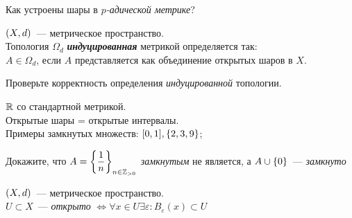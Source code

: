 \documentclass{article}
\begin{document}
    \begin{task_boxed}
        Как устроены шары в \textit{$p$-адической метрике}?
    \end{task_boxed}

    \begin{definition_boxed}
        $\lr*{X, d}$~--- метрическое пространство.\\
        Топология $\Omega_d$ \textbf{\textit{индуцированная}} метрикой определяется так:\\
        $A \in \Omega_d$, если $A$ представляется как объединение открытых шаров в $X$.
    \end{definition_boxed}

    \begin{task_boxed}
        Проверьте корректность определения \textit{индуцированной} топологии.
    \end{task_boxed}

    \begin{example}
        $\R$ со стандартной метрикой.\\
        Открытые шары = открытые интервалы.\\
        Примеры замкнутых множеств: $[0,1], \set*{2, 3, 9}$;
    \end{example}

    \begin{task_boxed}
        Докажите, что $A = \set*{\dfrac{1}{n}}_{n \in \Z_{>0}}$ \textit{замкнутым} не является, а
        $A \cup \set*{0}$~--- \textit{замкнуто}
    \end{task_boxed}


    \begin{task_boxed}
        $\lr*{X, d}$~--- метрическое пространство.\\
        $U \subset X$~--- \textit{открыто} $\Leftrightarrow \forall x \in U \exists \varepsilon: B_{\varepsilon}(x) \subset U$
    \end{task_boxed}
\end{document}
